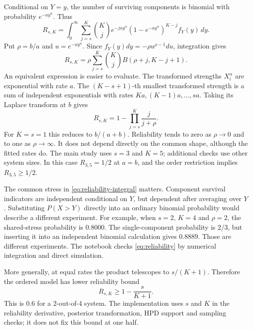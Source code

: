\documentclass[a4paper,11pt]{article}
\begin{document}
Conditional on $Y=y$, the number of surviving components is binomial with probability $e^{-ay^\alpha}$. Thus
\begin{equation}
R_{s,K}=\int_0^\infty\sum_{j=s}^K\binom Kj e^{-jay^\alpha}(1-e^{-ay^\alpha})^{K-j}f_Y(y)\,dy.\label{eq:reliability-integral}
\end{equation}
Put $\rho=b/a$ and $u=e^{-ay^\alpha}$. Since $f_Y(y)dy=-\rho u^{\rho-1}du$, integration gives
\begin{equation}
R_{s,K}=\rho\sum_{j=s}^K\binom Kj B(\rho+j,K-j+1).\label{eq:beta-reliability}
\end{equation}
An equivalent expression is easier to evaluate. The transformed strengths $X_i^\alpha$ are exponential with rate $a$. The $(K-s+1)$-th smallest transformed strength is a sum of independent exponentials with rates $Ka,(K-1)a,\ldots,sa$. Taking its Laplace transform at $b$ gives
\begin{equation}
\boxed{R_{s,K}=1-\prod_{j=s}^K\frac{j}{j+\rho}.}\label{eq:reliability}
\end{equation}
For $K=s=1$ this reduces to $b/(a+b)$. Reliability tends to zero as $\rho\to0$ and to one as $\rho\to\infty$. It does not depend directly on the common shape, although the fitted rates do. The main study uses $s=3$ and $K=5$; additional checks use other system sizes. In this case $R_{3,5}=1/2$ at $a=b$, and the order restriction implies $R_{3,5}\ge1/2$.

The common stress in \eqref{eq:reliability-integral} matters. Component survival indicators are independent conditional on $Y$, but dependent after averaging over $Y$. Substituting $P(X>Y)$ directly into an ordinary binomial probability would describe a different experiment. For example, when $s=2$, $K=4$ and $\rho=2$, the shared-stress probability is $0.8000$. The single-component probability is $2/3$, but inserting it into an independent binomial calculation gives $0.8889$. Those are different experiments. The notebook checks \eqref{eq:reliability} by numerical integration and direct simulation.

More generally, at equal rates the product telescopes to $s/(K+1)$. Therefore the ordered model has lower reliability bound
\begin{equation}
R_{s,K}\ge 1-\frac{s}{K+1}.\label{eq:order-bound}
\end{equation}
This is $0.6$ for a 2-out-of-4 system. The implementation uses $s$ and $K$ in the reliability derivative, posterior transformation, HPD support and sampling checks; it does not fix this bound at one half.
\end{document}
